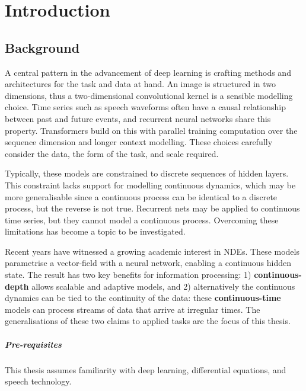 \chapter{Introduction}
\label{chap:intro}

\section{Background}


A central pattern in the advancement of deep learning is crafting methods and architectures for the task and data at hand. An image is structured in two dimensions, thus a two-dimensional convolutional kernel is a sensible modelling choice. Time series such as speech waveforms often have a causal relationship between past and future events, and recurrent neural networks share this property. Transformers build on this with parallel training computation over the sequence dimension and longer context modelling. These choices carefully consider the data, the form of the task, and scale required.


Typically, these models are constrained to discrete sequences of hidden layers. This constraint lacks support for modelling continuous dynamics, which may be more generalisable since a continuous process can be identical to a discrete process, but the reverse is not true. Recurrent nets may be applied to continuous time series, but they cannot model a continuous process. Overcoming these limitations has become a topic to be investigated.

Recent years have witnessed a growing academic interest in \acp{NDE}. These models parametrise a vector-field with a neural network, enabling a continuous hidden state. The result has two key benefits for information processing: 1) \textbf{continuous-depth} allows scalable and adaptive models, and 2) alternatively the continuous dynamics can be tied to the continuity of the data: these \textbf{continuous-time} models can process streams of data that arrive at irregular times. The generalisations of these two claims to applied tasks are the focus of this thesis.

\paragraph{Pre-requisites} This thesis assumes familiarity with deep learning, differential equations, and speech technology.

